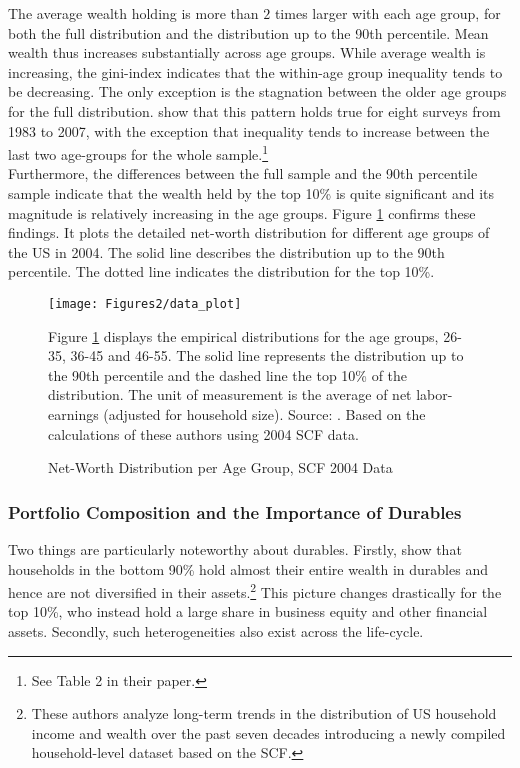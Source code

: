 \documentclass[a4paper,12pt,legno]{article}
\begin{document}
The average wealth holding is more than $2$ times larger with each age group, for both the full distribution and the distribution up to the 90th percentile. Mean wealth thus increases substantially across age groups. While average wealth is increasing, the gini-index indicates that the within-age group inequality tends to be decreasing. The only exception is the stagnation between the older age groups for the full distribution. \cite{hintermaier2011} show that this pattern holds true for eight surveys from 1983 to 2007, with the exception that inequality tends to  increase between the last two age-groups for the whole sample.\footnote{See Table 2 in their paper.} \\
Furthermore, the differences between the full sample and the 90th percentile sample indicate that the wealth held by the top 10\% is quite significant and its magnitude is relatively increasing in the age groups. Figure \ref{scf_data} confirms these findings. It plots the detailed net-worth distribution for different age groups of the US in 2004. The solid line describes the distribution up to the 90th percentile. The dotted line indicates the distribution for the top 10\%. 
\begin{figure}[!htbp]
\caption{Net-Worth Distribution per Age Group, SCF 2004 Data} 
\label{scf_data}	%
\centering
\texttt{[image: Figures2/data\_plot]}  %

\begin{minipage}{0.8\linewidth}
\footnotesize{Figure \ref{scf_data} displays the empirical distributions for the age groups, 26-35, 36-45 and 46-55. The solid line represents the distribution up to the 90th percentile and the dashed line the top 10\% of the distribution. The unit of measurement is the average of net labor-earnings (adjusted for household size). Source: \cite{hintermaier2011}. Based on the calculations of these authors using 2004 SCF data. }
\end{minipage}

\end{figure}

\subsubsection{Portfolio Composition and the Importance of Durables}
Two things are particularly noteworthy about durables. Firstly, \cite{kuhn2017income} show that households in the bottom 90\% hold almost their entire wealth in durables and hence are not diversified in their assets.\footnote{These authors analyze long-term trends in the distribution of US household income and wealth over the past seven decades introducing a newly compiled household-level dataset based on the SCF.} This picture changes drastically for the top 10\%, who instead hold a large share in business equity and other financial assets. Secondly, such heterogeneities also exist across the life-cycle. 
\end{document}
